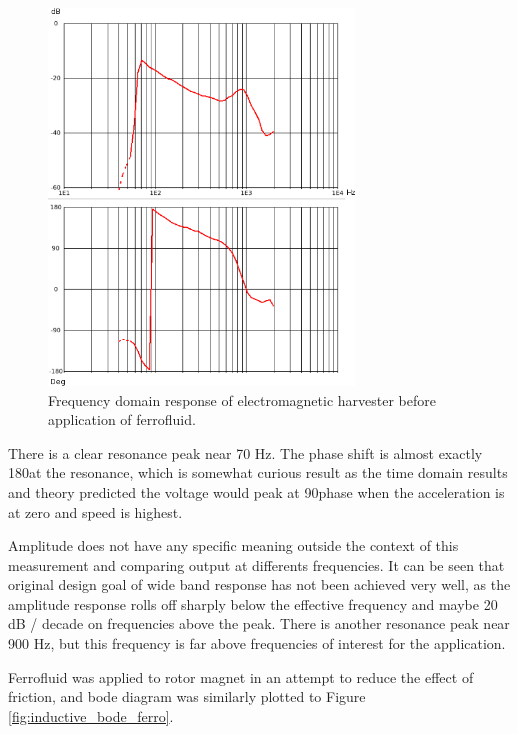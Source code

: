 \begin{figure}[htb]
\begin{center}
\includegraphics[height=10cm]{images/own_measurement/generator_shaker/inductive_fd_dry.png}
\end{center}
\caption{\label{fig:inductive_fd_dry} Frequency domain response of electromagnetic harvester before application of ferrofluid.}
\end{figure}

There is a clear resonance peak near 70 Hz. The phase shift is almost exactly 180\degree  at the resonance, which is somewhat curious result as the time domain results and theory predicted the voltage would peak at 90\degree  phase when the acceleration is at zero and speed is highest. 

Amplitude does not have any specific meaning outside the context of this measurement and comparing output at differents frequencies. It can be seen that original design goal of wide band response has not been achieved very well, as the amplitude response rolls off sharply below the effective frequency and maybe 20 dB / decade on frequencies above the peak. There is another resonance peak near 900 Hz, but this frequency is far above frequencies of interest for the application. 

Ferrofluid was applied to rotor magnet in an attempt to reduce the effect of friction, and bode diagram was similarly plotted to Figure \ref{fig:inductive_bode_ferro}.

